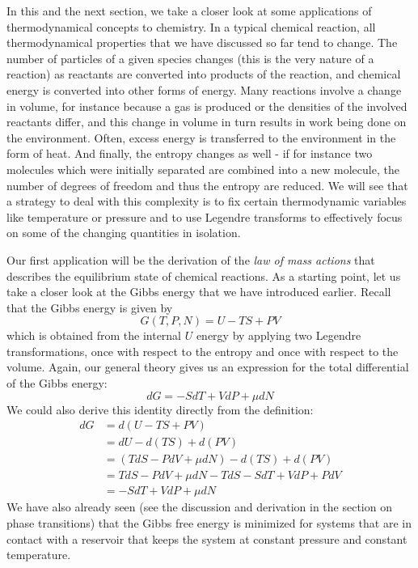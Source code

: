 \documentclass[a4paper, draft]{article}
\theoremstyle{own}
\theoremstyle{remark}
\begin{document}
In this and the next section, we take a closer look at some applications of thermodynamical concepts to chemistry. In a typical chemical reaction, all thermodynamical properties that we have discussed so far tend to change. The number of particles of a given species changes (this is the very nature of a reaction) as reactants are converted into products of the reaction, and chemical energy is converted into other forms of energy. Many reactions involve a change in volume, for instance because a gas is produced or the densities of the involved reactants differ, and this change in volume in turn results in work being done on the environment. Often, excess energy is transferred to the environment in the form of heat. And finally, the entropy changes as well - if for instance two molecules which were initially separated are combined into a new molecule, the number of degrees of freedom and thus the entropy are reduced. We will see that a strategy to deal with this complexity is to fix certain thermodynamic variables like temperature or pressure and to use Legendre transforms to effectively focus on some of the changing quantities in isolation.


Our first application will be the derivation of the {\em law of mass actions} that describes the equilibrium state of chemical reactions. As a starting point, let us take a closer look at the Gibbs energy that we have introduced earlier. Recall that the Gibbs energy is given by
$$
G(T, P, N) = U - TS + PV
$$
which is obtained from the internal $U$ energy by applying two Legendre transformations, once with respect to the entropy and once with respect to the volume. Again, our general theory gives us an expression for the total differential of the Gibbs energy:
$$
dG = - S dT + V dP + \mu dN
$$
We could also derive this identity directly from the definition:
\begin{align*}
dG &= d(U - TS + PV) \\
&= dU - d(TS) + d(PV) \\
&= (T dS - P dV  + \mu dN) - d(TS) + d(PV) \\
&= TdS - P dV + \mu dN - T dS - S dT + V dP + P dV \\
&=  - S dT + V dP + \mu dN  
\end{align*}
We have also already seen (see the discussion and derivation in the section on phase transitions) that the Gibbs free energy is minimized for systems that are in contact with a reservoir that keeps the system at constant pressure and constant temperature. 
\end{document}
